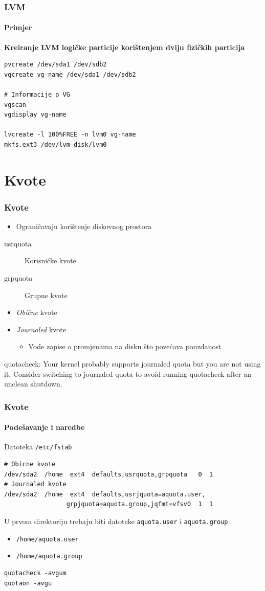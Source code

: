 \documentclass[t]{beamer}
\begin{document}
\begin{frame}[fragile]
	\frametitle{LVM}
	\framesubtitle{Primjer}
	\textbf{Kreiranje LVM logičke particije korištenjem dviju fizičkih particija}\\
	\begin{verbatim}
pvcreate /dev/sda1 /dev/sdb2
vgcreate vg-name /dev/sda1 /dev/sdb2

# Informacije o VG
vgscan
vgdisplay vg-name

lvcreate -l 100%FREE -n lvm0 vg-name
mkfs.ext3 /dev/lvm-disk/lvm0
	\end{verbatim}
\end{frame}

\section{Kvote}
\begin{frame}
	\frametitle{Kvote}
	\begin{itemize}
		\item Ograničavaju korištenje diskovnog prostora
	\end{itemize}
	\begin{description}
		\item[usrquota] Korisničke kvote
		\item[grpquota] Grupne kvote
	\end{description}
	\begin{itemize}
		\item \emph{Obične} kvote
		\item \emph{Journaled} kvote
		\begin{itemize}
			\item Vode zapise o promjenama na disku što povećava pouzdanost
		\end{itemize}
	\end{itemize}
	\vspace{1em}
	{\ttfamily \small
		quotacheck: Your kernel probably supports journaled quota but you are not using it.
		Consider switching to journaled quota to avoid running quotacheck after an unclean
		shutdown.
	}
\end{frame}

\begin{frame}[fragile]
	\frametitle{Kvote}
	\framesubtitle{Podešavanje i naredbe}
	Datoteka \texttt{/etc/fstab}
	{\small \begin{verbatim}
# Obicne kvote
/dev/sda2  /home  ext4  defaults,usrquota,grpquota   0  1
# Journaled kvote
/dev/sda2  /home  ext4  defaults,usrjquota=aquota.user,
                 grpjquota=aquota.group,jqfmt=vfsv0  1  1
	\end{verbatim} }
	U prvom direktoriju trebaju biti datoteke \texttt{aquota.user} i \texttt{aquota.group}
	\begin{itemize}
		\item[] \texttt{/home/aquota.user}
		\item[] \texttt{/home/aquota.group}
	\end{itemize}
	\begin{verbatim}
quotacheck -avgum
quotaon -avgu
	\end{verbatim}
\end{frame}
\end{document}
